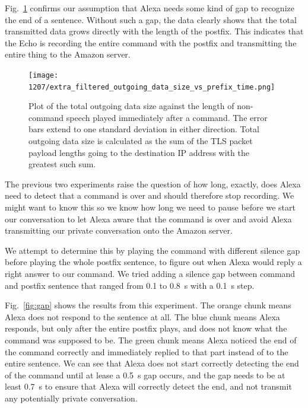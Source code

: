 Fig.~\ref{fig:postfix_nogap} confirms our assumption that Alexa needs some kind of gap to recognize the end of a sentence. Without such a gap, the data clearly shows that the total transmitted data grows directly with the length of the postfix. This indicates that the Echo is recording the entire command with the postfix and transmitting the entire thing to the Amazon server.


\begin{figure}[!t]
    \centering
    \texttt{[image: 1207/extra\_filtered\_outgoing\_data\_size\_vs\_prefix\_time.png]}
    \caption{Plot of the total outgoing data size against the length of non-command speech played immediately after a command. The error bars extend to one standard deviation in either direction. Total outgoing data size is calculated as the sum of the TLS packet payload lengths going to the destination IP address with the greatest such sum.}
    \label{fig:postfix_nogap}
\end{figure}

The previous two experiments raise the question of how long, exactly, does Alexa need to detect that a command is over and should therefore stop recording. We might want to know this so we know how long we need to pause before we start our conversation to let Alexa aware that the command is over and avoid Alexa transmitting our private conversation onto the Amazon server.

We attempt to determine this by playing the command with different silence gap before playing the whole postfix sentence, to figure out when Alexa would reply a right answer to our command. We tried adding a silence gap between command and postfix sentence that ranged from 0.1 to 0.8~s with a 0.1~s step.

Fig.~\ref{fig:gap} shows the results from this experiment. The orange chunk means Alexa does not respond to the sentence at all. The blue chunk means Alexa responds, but only after the entire postfix plays, and does not know what the command was supposed to be. The green chunk means Alexa noticed the end of the command correctly and immediately replied to that part instead of to the entire sentence. We can see that Alexa does not start correctly detecting the end of the command until at lease a 0.5~s gap occurs, and the gap needs to be at least 0.7~s to ensure that Alexa will correctly detect the end, and not transmit any potentially private conversation.


